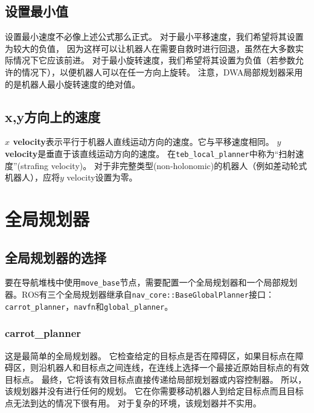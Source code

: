 \subsection[Setting minimum values]{设置最小值}

设置最小速度不必像上述公式那么正式。 
对于最小平移速度，我们希望将其设置为较大的负值，
因为这样可以让机器人在需要自救时进行回退，虽然在大多数实际情况下它应该前进。
对于最小旋转速度，我们希望将其设置为负值（若参数允许的情况下），以便机器人可以在任一方向上旋转。 
注意，DWA局部规划器采用的是机器人最小旋转速度的绝对值。


\subsection[Velocity in x, y direction]{x,y方向上的速度}

\textbf{$x$ velocity}表示平行于机器人直线运动方向的速度。它与平移速度相同。
\textbf{$y$ velocity}是垂直于该直线运动方向的速度。
在\texttt{teb_local_planner}中称为“扫射速度”(strafing velocity)。
对于非完整类型(non-holonomic)的机器人（例如差动轮式机器人），应将$y$ velocity设置为零。




\section[Global Planner]{全局规划器}

\subsection[Global Planner Selection]{全局规划器的选择}
要在导航堆栈中使用\texttt{move_base}节点，需要配置一个全局规划器和一个局部规划器。ROS有三个全局规划器继承自\texttt{nav_core::BaseGlobalPlanner}接口：\texttt{carrot_planner}，\texttt{navfn}和\texttt{global_planner}。

\subsubsection{carrot\_planner}

这是最简单的全局规划器。 
它检查给定的目标点是否在障碍区，如果目标点在障碍区，则沿机器人和目标点之间连线，在连线上选择一个最接近原始目标点的有效目标点。 
最终，它将该有效目标点直接传递给局部规划器或内容控制器。
所以，该规划器并没有进行任何的规划。
它在你需要移动机器人到给定目标点而且目标点无法到达的情况下很有用。
对于复杂的环境，该规划器并不实用。

